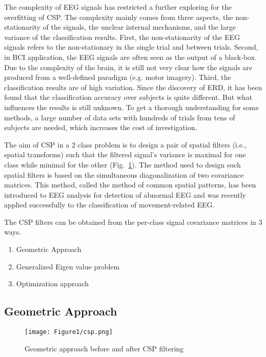 The complexity of EEG signals has restricted a further exploring for the overfitting of CSP. The complexity mainly comes from three aspects, the non-stationarity of the signals, the unclear internal mechanisms, and the large variance of the classification results. First, the non-stationarity of the EEG signals refers to the non-stationary in the single trial and between trials. Second, in BCI application, the EEG signals are often seen as the output of a black-box. Due to the complexity of the brain, it is still not very clear how the signals are produced from a well-defined paradigm (e.g. motor imagery). Third, the classification results are of high variation. Since the discovery of ERD, it has been found that the classification accuracy over subjects is quite different. But what influences the results is still unknown. To get a thorough understanding for some methods, a large number of data sets with hundreds of trials from tens of subjects are needed, which increases the cost of investigation.

The aim of CSP in a 2 class problem is to design a pair of spatial filters (i.e., spatial transforms) such that the filtered signal's variance is maximal for one class while minimal for the other (Fig.~\ref{geom}). The method used to design such spatial filters is based on the simultaneous diagonalization of two covariance matrices. This method, called the method of common spatial patterns, has been introduced to EEG analysis for detection of abnormal EEG  and was recently applied successfully to the classification of movement-related EEG.

The CSP filters can be obtained from the per-class signal covariance matrices in 3 ways.
\begin{enumerate}
\item Geometric Approach
\item Generalized Eigen value problem
\item Optimization approach
\end{enumerate}

\subsection{Geometric Approach}

\begin{figure}
\centering
\texttt{[image: Figure1/csp.png]}
\caption{Geometric approach before and after CSP filtering}
\label{geom}
\end{figure}

